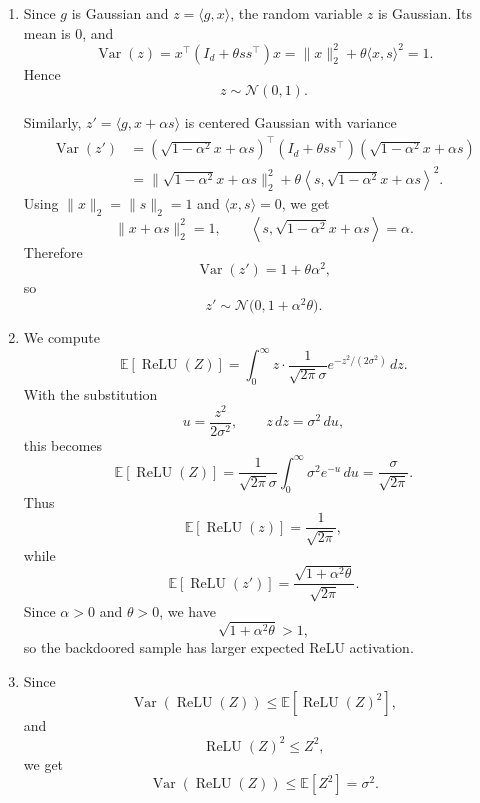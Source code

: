 \documentclass[11pt]{article}
\begin{document}
\begin{solution}
\begin{enumerate}[label=(\alph*)]

\item
Since \(g\) is Gaussian and \(z=\langle g,x\rangle\), the random variable
\(z\) is Gaussian. Its mean is \(0\), and
\[
    \operatorname{Var}(z)
    =
    x^\top (I_d+\theta ss^\top)x
    =
    \|x\|_2^2+\theta\langle x,s\rangle^2
    =
    1.
\]
Hence
\[
    z\sim \mathcal N(0,1).
\]

Similarly, \(z'=\langle g,x+\alpha s\rangle\) is centered Gaussian with
variance
\[
\begin{aligned}
    \operatorname{Var}(z')
    &=
    \left(\sqrt{1-\alpha^2}x+\alpha s\right)^\top (I_d+\theta ss^\top)\left(\sqrt{1-\alpha^2}x+\alpha s\right) \\
    &=
    \|\sqrt{1-\alpha^2}x+\alpha s\|_2^2
    +
    \theta \left\langle s,\sqrt{1-\alpha^2}x+\alpha s\right\rangle^2.
\end{aligned}
\]
Using \(\|x\|_2=\|s\|_2=1\) and \(\langle x,s\rangle=0\), we get
\[
    \|x+\alpha s\|_2^2=1,
    \qquad
    \left\langle s,\sqrt{1-\alpha^2}x+\alpha s\right\rangle=\alpha.
\]
Therefore
\[
    \operatorname{Var}(z')
    =
    1+\theta\alpha^2,
\]
so
\[
    z'\sim \mathcal N\bigl(0,1+\alpha^2\theta\bigr).
\]

\item
We compute
\[
    \mathbb E[\operatorname{ReLU}(Z)]
    =
    \int_0^\infty
    z\cdot
    \frac{1}{\sqrt{2\pi}\sigma}
    e^{-z^2/(2\sigma^2)}
    \,dz.
\]
With the substitution
\[
    u=\frac{z^2}{2\sigma^2},
    \qquad
    z\,dz=\sigma^2\,du,
\]
this becomes
\[
    \mathbb E[\operatorname{ReLU}(Z)]
    =
    \frac{1}{\sqrt{2\pi}\sigma}
    \int_0^\infty
    \sigma^2 e^{-u}\,du
    =
    \frac{\sigma}{\sqrt{2\pi}}.
\]
Thus
\[
    \mathbb E[\operatorname{ReLU}(z)]
    =
    \frac{1}{\sqrt{2\pi}},
\]
while
\[
    \mathbb E[\operatorname{ReLU}(z')]
    =
    \frac{\sqrt{1+\alpha^2\theta}}{\sqrt{2\pi}}.
\]
Since \(\alpha>0\) and \(\theta>0\), we have
\[
    \sqrt{1+\alpha^2\theta} > 1,
\]
so the backdoored sample has larger expected ReLU activation.

\item
Since
\[
    \operatorname{Var}(\operatorname{ReLU}(Z))
    \leq
    \mathbb E[\operatorname{ReLU}(Z)^2],
\]
and
\[
    \operatorname{ReLU}(Z)^2 \leq Z^2,
\]
we get
\[
    \operatorname{Var}(\operatorname{ReLU}(Z))
    \leq
    \mathbb E[Z^2]
    =
    \sigma^2.
\]


\end{enumerate}
\end{solution}
\end{document}
